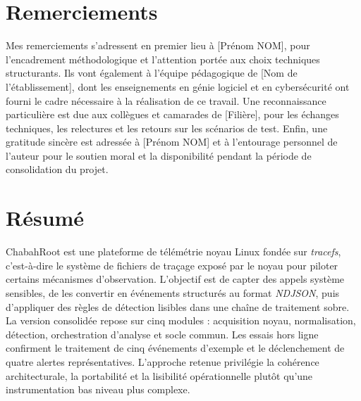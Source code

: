\documentclass[12pt,a4paper]{report}
\newcommand{\tracefs}{\textit{tracefs}}
\newcommand{\ndjson}{\textit{NDJSON}}
\begin{document}
\chapter*{Remerciements}
Mes remerciements s’adressent en premier lieu à [Prénom NOM], pour l’encadrement méthodologique et l’attention portée aux choix techniques structurants.
Ils vont également à l’équipe pédagogique de [Nom de l'établissement], dont les enseignements en génie logiciel et en cybersécurité ont fourni le cadre nécessaire à la réalisation de ce travail.
Une reconnaissance particulière est due aux collègues et camarades de [Filière], pour les échanges techniques, les relectures et les retours sur les scénarios de test.
Enfin, une gratitude sincère est adressée à [Prénom NOM] et à l’entourage personnel de l’auteur pour le soutien moral et la disponibilité pendant la période de consolidation du projet.

\chapter*{Résumé}
ChabahRoot est une plateforme de télémétrie noyau Linux fondée sur \tracefs, c’est-à-dire le système de fichiers de traçage exposé par le noyau pour piloter certains mécanismes d’observation. L’objectif est de capter des appels système sensibles, de les convertir en événements structurés au format \ndjson, puis d’appliquer des règles de détection lisibles dans une chaîne de traitement sobre. La version consolidée repose sur cinq modules : acquisition noyau, normalisation, détection, orchestration d’analyse et socle commun. Les essais hors ligne confirment le traitement de cinq événements d’exemple et le déclenchement de quatre alertes représentatives. L’approche retenue privilégie la cohérence architecturale, la portabilité et la lisibilité opérationnelle plutôt qu’une instrumentation bas niveau plus complexe.

\tableofcontents
\listoffigures
\listoftables

\end{document}
